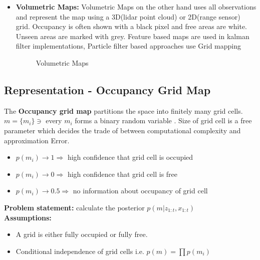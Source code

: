 \documentclass{article}
\begin{document}
\begin{itemize}
\item \textbf{Volumetric Maps:} Volumetric Maps on the other hand uses all observations and represent the map using a 3D(lidar point cloud) or 2D(range sensor) grid. Occupancy is often shown with a black pixel and free areas are white. Unseen areas are marked with grey. Feature based maps are used in kalman filter implementations, Particle filter based approaches use Grid mapping  
    \begin{figure}%
    \centering
    \qquad
    \caption{Volumetric Maps}%
    \label{fig:example}%
    \end{figure}
\end{itemize}

\subsection{Representation - Occupancy Grid Map}
 The \textbf{Occupancy grid map} partitions the space into finitely many grid cells. $m = \{m_i\} \ni $ every $m_i$ forms a binary random variable . Size of grid cell is a free parameter which decides the trade of between computational complexity and approximation Error. 
\begin{itemize}
    \item $p(m_i) \to 1 \Rightarrow $ high confidence that grid cell is occupied
    \item $p(m_i) \to 0 \Rightarrow $ high confidence that grid cell is free
    \item $p(m_i) \to 0.5 \Rightarrow $ no information about occupancy of grid cell
\end{itemize}
\textbf{Problem statement:} calculate the posterior $p(m|z_{1:t},x_{1:t})$ \\
\newline
\textbf{Assumptions:}
\begin{itemize}
        \item A grid is either fully occupied or fully free.
        \item Conditional independence of grid cells i.e.  $p(m) = \prod  p(m_i)$
\end{itemize}
\end{document}
